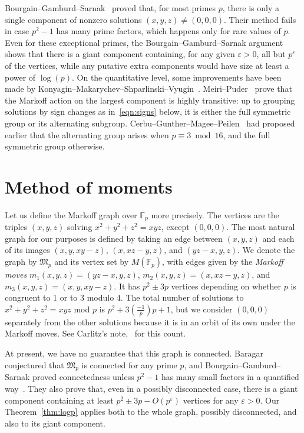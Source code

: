 \documentclass[10pt]{amsart}
\theoremstyle{definition}\newtheorem{defi}[theo]{Definition}\newtheorem{rema}[theo]{Remark}\newtheorem{exam}[theo]{Example}\newtheorem{exem}[theo]{Example}\newtheorem{nota}[theo]{Notation}
\newcommand{\F}{\mathbb{F}}
\begin{document}
Bourgain--Gamburd--Sarnak~\cite{BGS} proved that, for most primes $p$, there is only a single component of nonzero solutions $(x,y,z) \neq (0,0,0)$. Their method fails in case $p^2-1$ has many prime factors, which happens only for rare values of $p$. Even for these exceptional primes, the Bourgain--Gamburd--Sarnak argument shows that there is a giant component containing, for any given $\varepsilon > 0$, all but $p^{\varepsilon}$ of the vertices, while any putative extra components would have size at least a power of $\log(p)$. On the quantitative level, some improvements have been made by Konyagin--Makarychev--Shparlinski--Vyugin~\cite[Theorems~1.3 and 1.4]{KMSV}. Meiri--Puder~\cite{MPC} prove that the Markoff action on the largest component is highly transitive: up to grouping solutions by sign changes as in~\eqref{eqn:signs} below, it is either the full symmetric group or its alternating subgroup. Cerbu--Gunther--Magee--Peilen~\cite{CGMP} had proposed earlier that the alternating group arises when $p \equiv 3 \bmod 16$, and the full symmetric group otherwise.

\section{Method of moments}\label{sec:graph}

Let us define the Markoff graph over $\F_p$ more precisely. The vertices are the triples $(x,y,z)$ solving $x^2 + y^2 + z^2 = xyz$, except $(0,0,0)$. The most natural graph for our purposes is defined by taking an edge between $(x,y,z)$ and each of its images $(x,y,xy-z)$, $(x,xz-y,z)$, and $(yz-x,y,z)$. We denote the graph by $\mathfrak{M}_p$ and its vertex set by $M(\F_p)$, with edges given by the \emph{Markoff moves} $m_1(x,y,z) = (yz-x,y,z)$, $m_2(x,y,z) = (x,xz-y,z)$, and $m_3(x,y,z)=(x,y,xy-z)$. It has $p^2 \pm 3p$ vertices depending on whether $p$ is congruent to 1 or to 3 modulo 4. The total number of solutions to $x^2+y^2+z^2=xyz$ mod $p$ is $p^2 + 3(\tfrac{-1}{p})p + 1$, but we consider $(0,0,0)$ separately from the other solutions because it is in an orbit of its own under the Markoff moves. See Carlitz's note,~\cite[equation~(2)]{C} for this count.

At present, we have no guarantee that this graph is connected. Baragar~\cite{Bar} conjectured that $\mathfrak{M}_p$ is connected for any prime $p$, and Bourgain--Gamburd--Sarnak proved connectedness unless $p^2-1$ has many small factors in a quantified way~\cite{BGS}. They also prove that, even in a possibly disconnected case, there is a giant component containing at least $p^2 \pm 3p - O(p^{\varepsilon})$ vertices for any $\varepsilon > 0$. Our Theorem~\ref{thm:logp} applies both to the whole graph, possibly disconnected, and also to its giant component.
\end{document}

